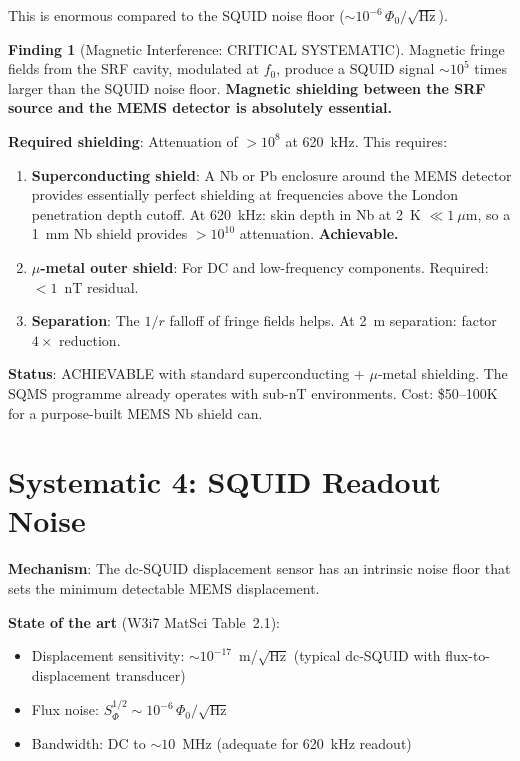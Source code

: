 \documentclass[11pt]{article}
\theoremstyle{definition}
\newtheorem{finding}[theorem]{Finding}
\theoremstyle{remark}
\begin{document}
This is enormous compared to the SQUID noise floor
($\sim 10^{-6}\,\Phi_0/\sqrt{\text{Hz}}$).

\begin{finding}[Magnetic Interference: CRITICAL SYSTEMATIC]
\label{find:magnetic}
Magnetic fringe fields from the SRF cavity, modulated at $f_0$,
produce a SQUID signal $\sim 10^5$ times larger than the SQUID noise
floor. \textbf{Magnetic shielding between the SRF source and the MEMS
detector is absolutely essential.}

\textbf{Required shielding}: Attenuation of $> 10^{8}$ at 620~kHz.
This requires:
\begin{enumerate}[nosep]
\item \textbf{Superconducting shield}: A Nb or Pb enclosure around
  the MEMS detector provides essentially perfect shielding at
  frequencies above the London penetration depth cutoff. At 620~kHz:
  skin depth in Nb at 2~K $\ll 1~\mu$m, so a 1~mm Nb shield
  provides $> 10^{10}$ attenuation. \textbf{Achievable.}
\item \textbf{$\mu$-metal outer shield}: For DC and low-frequency
  components. Required: $< 1$~nT residual.
\item \textbf{Separation}: The $1/r$ falloff of fringe fields helps.
  At 2~m separation: factor $4\times$ reduction.
\end{enumerate}

\textbf{Status}: \textcolor{strongcolor}{ACHIEVABLE with standard
superconducting + $\mu$-metal shielding. The SQMS programme already
operates with sub-nT environments. Cost: \$50--100K for a
purpose-built MEMS Nb shield can.}
\end{finding}


\section{Systematic 4: SQUID Readout Noise}
\label{sec:squid_noise}

\textbf{Mechanism}: The dc-SQUID displacement sensor has an intrinsic
noise floor that sets the minimum detectable MEMS displacement.

\textbf{State of the art} (W3i7 MatSci Table~2.1):
\begin{itemize}[nosep]
\item Displacement sensitivity: $\sim 10^{-17}$~m/$\sqrt{\text{Hz}}$
  (typical dc-SQUID with flux-to-displacement transducer)
\item Flux noise: $S_\Phi^{1/2} \sim 10^{-6}\,\Phi_0/\sqrt{\text{Hz}}$
\item Bandwidth: DC to $\sim 10$~MHz (adequate for 620~kHz readout)
\end{itemize}
\end{document}
